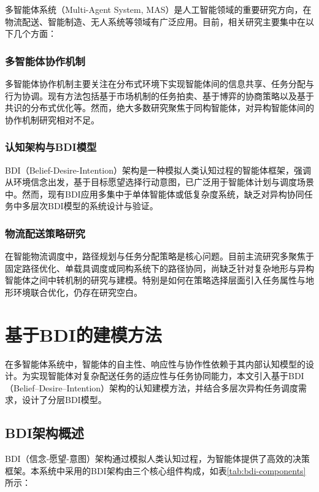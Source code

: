 \documentclass[12pt,a4paper]{article}
\begin{document}
多智能体系统（Multi-Agent System, MAS）是人工智能领域的重要研究方向，在物流配送、智能制造、无人系统等领域有广泛应用。目前，相关研究主要集中在以下几个方面：

\subsubsection{多智能体协作机制}

多智能体协作机制主要关注在分布式环境下实现智能体间的信息共享、任务分配与行为协调。现有方法包括基于市场机制的任务拍卖、基于博弈的协商策略以及基于共识的分布式优化等。然而，绝大多数研究聚焦于同构智能体，对异构智能体间的协作机制研究相对不足。

\subsubsection{认知架构与BDI模型}

BDI（Belief-Desire-Intention）架构\cite{rao1995bdi}是一种模拟人类认知过程的智能体框架，强调从环境信念出发，基于目标愿望选择行动意图，已广泛用于智能体计划与调度场景中。然而，现有BDI应用多集中于单体智能体或低复杂度系统，缺乏对异构协同任务中多层次BDI模型的系统设计与验证。

\subsubsection{物流配送策略研究}

在智能物流调度中，路径规划与任务分配策略是核心问题。目前主流研究多聚焦于固定路径优化、单载具调度或同构系统下的路径协同，尚缺乏针对复杂地形与异构智能体之间中转机制的研究与建模。特别是如何在策略选择层面引入任务属性与地形环境联合优化，仍存在研究空白。

\section{基于BDI的建模方法}

在多智能体系统中，智能体的自主性、响应性与协作性依赖于其内部认知模型的设计。为实现智能体对复杂配送任务的适应性与任务协同能力，本文引入基于BDI（Belief–Desire–Intention）架构的认知建模方法，并结合多层次异构任务调度需求，设计了分层BDI模型。

\subsection{BDI架构概述}

BDI（信念-愿望-意图）架构通过模拟人类认知过程，为智能体提供了高效的决策框架。本系统中采用的BDI架构由三个核心组件构成，如表\ref{tab:bdi-components}所示：
\end{document}
